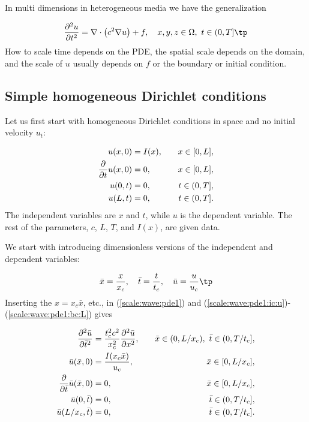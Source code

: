 \documentclass[graybox,envcountchap,sectrefs,final]{svmonodo}
\begin{document}
In multi dimensions in heterogeneous media we have the generalization

\begin{equation}
\frac{\partial^2 u}{\partial t^2} =
\nabla\cdot\left(c^2 \nabla u\right) + f, \quad  x,y,z\in \Omega,\ t\in (0,T]\tp
\label{scale:wave:pde1:3D}
\end{equation}
How to scale time depends on the PDE, the spatial scale depends on
the domain, and the scale of $u$ usually depends on $f$ or the
boundary or initial condition.

\subsection{Simple homogeneous Dirichlet conditions}

Let us first start with homogeneous Dirichlet conditions in space and
no initial velocity $u_t$:

\begin{align}
u(x,0) &= I(x), \quad &x\in [0,L],
\label{scale:wave:pde1:ic:u}\\ 
{\partial\over\partial t}u(x,0) &= 0, \quad & x\in [0,L],
\label{scale:wave:pde1:ic:ut}\\ 
u(0,t) & = 0, \quad  & t\in (0,T],
\label{scale:wave:pde1:bc:0}\\ 
u(L,t) & = 0, \quad  & t\in (0,T].
\label{scale:wave:pde1:bc:L}
\end{align}
The independent variables are $x$ and $t$, while $u$ is the dependent
variable.
The rest of the parameters, $c$, $L$, $T$, and $I(x)$, are given data.

We start with introducing dimensionless versions of the independent and
dependent variables:

\[
\bar x = \frac{x}{x_c},\quad \bar t=\frac{t}{t_c},\quad\bar u=\frac{u}{u_c}
\tp
\]
Inserting the $x=x_c\bar x$, etc., in (\ref{scale:wave:pde1}) and
(\ref{scale:wave:pde1:ic:u})-(\ref{scale:wave:pde1:bc:L}) gives

\begin{align*}
\frac{\partial^2 \bar u}{\partial \bar t^2} &=
\frac{t_c^2c^2}{x_c^2}{\partial^2 \bar u\over\partial x^2}, \quad & \bar x\in (0,L/x_c),\ \bar t\in (0,T/t_c],
\\ 
\bar u(\bar x,0) &= \frac{I(x_c\bar x)}{u_c},
\quad &\bar x\in [0,L/x_c],
\\ 
\frac{\partial}{\partial \bar t}\bar u(\bar x,0) &= 0,
\quad & \bar x\in [0,L/x_c],
\\ 
\bar u(0,\bar t) & = 0,
\quad  & \bar t\in (0,T/t_c],
\\ 
\bar u(L/x_c,\bar t) & = 0,
\quad &\bar t\in (0,T/t_c].
\end{align*}
\end{document}
